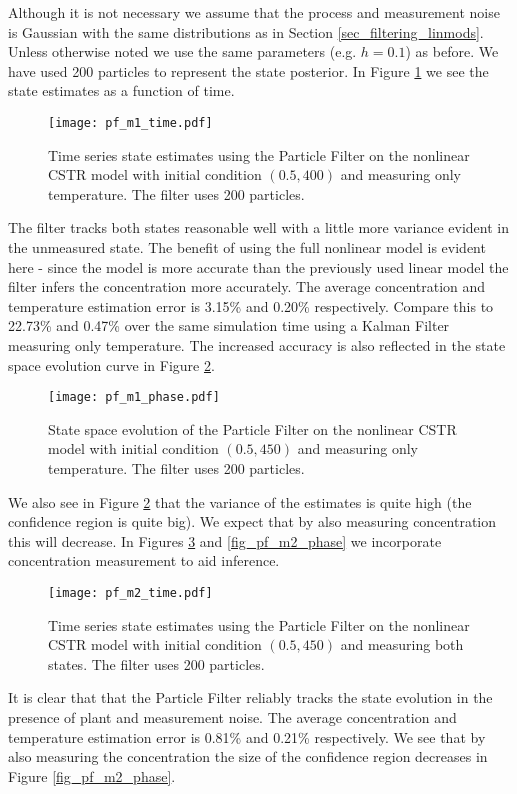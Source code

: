 Although it is not necessary we assume that the process and measurement noise is Gaussian with the same distributions as in Section \ref{sec_filtering_linmods}. Unless otherwise noted we use the same parameters (e.g. $h=0.1$) as before. We have used 200 particles to represent the state posterior. In Figure \ref{fig_pf_m1_time} we see the state estimates as a function of time.
\begin{figure}[H] 
\centering
\texttt{[image: pf\_m1\_time.pdf]}
\caption{Time series state estimates using the Particle Filter on the nonlinear CSTR model with initial condition $(0.5, 400)$ and measuring only temperature. The filter uses 200 particles.}
\label{fig_pf_m1_time}
\end{figure}
The filter tracks both states reasonable well with a little more variance evident in the unmeasured state. The benefit of using the full nonlinear model is evident here - since the model is more accurate than the previously used linear model the filter infers the concentration more accurately. The average concentration and temperature estimation error is 3.15\% and 0.20\% respectively. Compare this to 22.73\% and 0.47\% over the same simulation time using a Kalman Filter measuring only temperature. The increased accuracy is also reflected in the state space evolution curve in Figure \ref{fig_pf_m1_phase}.
\begin{figure}[H] 
\centering
\texttt{[image: pf\_m1\_phase.pdf]}
\caption{State space evolution of the Particle Filter on the nonlinear CSTR model with initial condition $(0.5, 450)$ and measuring only temperature. The filter uses 200 particles.}
\label{fig_pf_m1_phase}
\end{figure}
We also see in Figure \ref{fig_pf_m1_phase} that the variance of the estimates is quite high (the confidence region is quite big). We expect that by also measuring concentration this will decrease. In Figures \ref{fig_pf_m2_time} and \ref{fig_pf_m2_phase} we incorporate concentration measurement to aid inference. 
\begin{figure}[H] 
\centering
\texttt{[image: pf\_m2\_time.pdf]}
\caption{Time series state estimates using the Particle Filter on the nonlinear CSTR model with initial condition $(0.5, 450)$ and measuring both states. The filter uses 200 particles.}
\label{fig_pf_m2_time}
\end{figure}
It is clear that that the Particle Filter reliably tracks the state evolution in the presence of plant and measurement noise. The average concentration and temperature estimation error is 0.81\% and 0.21\% respectively. We see that by also measuring the concentration the size of the confidence region decreases in Figure \ref{fig_pf_m2_phase}. 

